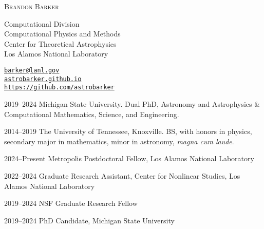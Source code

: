 \documentclass[11pt]{vitae}
\begin{document}
\thispagestyle{empty}
{\LARGE\scshape Brandon Barker}

\parbox[t]{186pt}{%
Computational Division\\
Computational Physics and Methods\\
Center for Theoretical Astrophysics\\
Los Alamos National Laboratory\\
}
\hfill
\parbox[t]{220pt}{%
\href{mailto:barker@lanl.gov}{\texttt{barker@lanl.gov}}\\
\href{astrobarker.github.io}{\texttt{astrobarker.github.io}}\\
\href{https://github.com/astrobarker}{\texttt{https://github.com/astrobarker}}\\
}

\vspace{4.0ex plus1ex minus0.5ex}

\begin{chronlist}
\item[2019--2024] Michigan State University. Dual PhD, Astronomy and Astrophysics \& 
 Computational Mathematics, Science, and Engineering.

\item[2014--2019] The University of Tennessee, Knoxville.  BS,
  with honors in physics, secondary major in mathematics,
  minor in astronomy, \emph{magna cum laude}.

\end{chronlist}

\begin{chronlist}
\item[2024--Present] Metropolis Postdoctoral Fellow, Los Alamos National Laboratory
\item[2022--2024] Graduate Research Assistant, Center for Nonlinear Studies, Los Alamos National Laboratory
\item[2019--2024] NSF Graduate Research Fellow
\item[2019--2024] PhD Candidate, Michigan State University
\end{chronlist}

\end{document}
